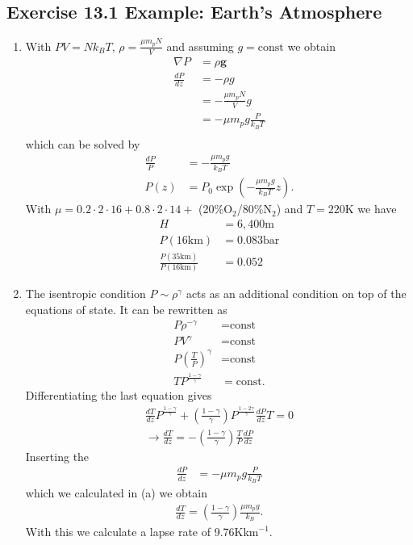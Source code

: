 \documentclass[../main.tex]{subfiles}
\begin{document}
\subsection{Exercise 13.1 Example: Earth's Atmosphere}
\begin{enumerate}[label=(\alph*)]
\item With $PV=Nk_BT$, $\rho=\frac{\mu m_p N}{V}$ and assuming $g=\text{const}$ we obtain
\begin{align}
    \nabla P&=\rho \mathbf{g}\\
    \frac{dP}{dz} &=-\rho g\\
    &=-\frac{\mu m_p N}{V} g\\
    &=-\mu m_p g\frac{P}{k_BT}\\
\end{align}
which can be solved by
\begin{align}
    \frac{dP}{P}&=-\frac{\mu m_p g}{k_BT}\\
    P(z)&=P_0\exp\left(-\frac{\mu m_p g}{k_B T}z\right).
\end{align}
With $\mu=0.2\cdot2\cdot16+0.8\cdot2\cdot14+$ (20\%O$_2$/80\%N$_2$) and $T=220$K we have
\begin{align}
    H&=6,400\text{m}\\
    P(16\text{km})&=0.083\text{bar}\\
    \frac{P(35\text{km})}{P(16\text{km})}&=0.052
\end{align}
\item The isentropic condition $P\sim\rho^\gamma$ acts as an additional condition on top of the equations of state. It can be rewritten as
\begin{align}
    P\rho^{-\gamma}&=\text{const}\\
    PV^{\gamma}&=\text{const}\\
    P\left(\frac{T}{P}\right)^{\gamma}&=\text{const}\\
    TP^\frac{1-\gamma}{\gamma}&=\text{const}.
\end{align}
Differentiating the last equation gives
\begin{align}
    \frac{dT}{dz}P^\frac{1-\gamma}{\gamma}+\left(\frac{1-\gamma}{\gamma}\right)P^{\frac{1-2\gamma}{\gamma}}\frac{dP}{dz}T=0\\
    \rightarrow\frac{dT}{dz}=-\left(\frac{1-\gamma}{\gamma}\right)\frac{T}{P}\frac{dP}{dz}
\end{align}
Inserting the
\begin{align}
    \frac{dP}{dz}&=-\mu m_p g\frac{P}{k_BT}
\end{align}
which we calculated in (a) we obtain
\begin{align}
    \frac{dT}{dz}=\left(\frac{1-\gamma}{\gamma}\right)\frac{\mu m_p g}{k_B}.
\end{align}
With this we calculate a lapse rate of 9.76K\;km$^{-1}$.
\end{enumerate}
\end{document}
